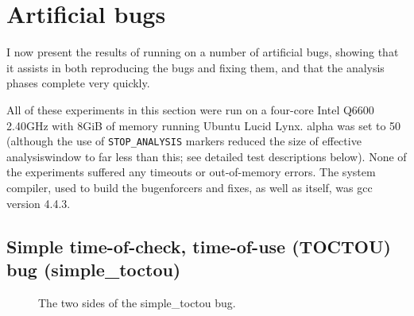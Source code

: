 \section{Artificial bugs}
\label{sect:eval:artificial}

I now present the results of running {\implementation} on a number of
artificial bugs, showing that it assists in both reproducing the bugs
and fixing them, and that the analysis phases complete very quickly.

All of these experiments in this section were run on a four-core Intel
Q6600 2.40GHz with 8GiB of memory running Ubuntu Lucid Lynx.
\gls{alpha} was set to 50 (although the use of \texttt{STOP\_ANALYSIS}
markers reduced the size of effective \gls{analysiswindow} to far less
than this; see detailed test descriptions below).  None of the
experiments suffered any timeouts or out-of-memory errors.  The system
compiler, used to build the \glspl{bugenforcer} and fixes, as well as
{\implementation} itself, was gcc version 4.4.3.

\subsection{Simple time-of-check, time-of-use (TOCTOU) bug (simple\_toctou)}
\label{sect:eval:simple_toctou}

\begin{figure}
  \hfill %
  \hfill
  \caption{The two sides of the simple\_toctou bug.}
  \label{fig:eval:simple_toctou}
\end{figure}

